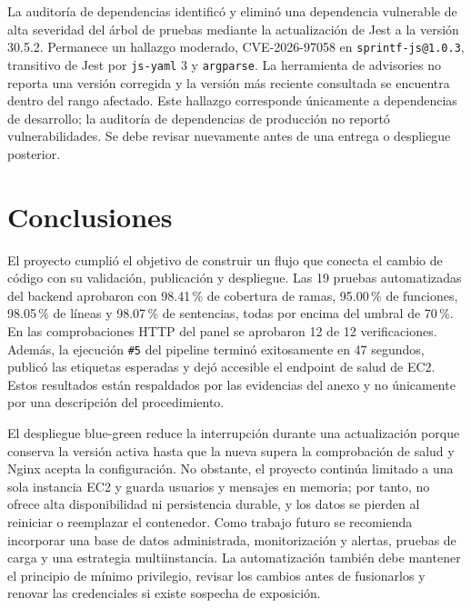 \documentclass[12pt,letterpaper]{article}
\begin{document}
La auditoría de dependencias identificó y eliminó una dependencia vulnerable de alta severidad del árbol de pruebas mediante la actualización de Jest a la versión 30.5.2. Permanece un hallazgo moderado, CVE-2026-97058 en \texttt{sprintf-js@1.0.3}, transitivo de Jest por \texttt{js-yaml} 3 y \texttt{argparse}. La herramienta de advisories no reporta una versión corregida y la versión más reciente consultada se encuentra dentro del rango afectado. Este hallazgo corresponde únicamente a dependencias de desarrollo; la auditoría de dependencias de producción no reportó vulnerabilidades. Se debe revisar nuevamente antes de una entrega o despliegue posterior.

\section{Conclusiones}
El proyecto cumplió el objetivo de construir un flujo que conecta el cambio de código con su validación, publicación y despliegue. Las 19 pruebas automatizadas del backend aprobaron con 98.41\,\% de cobertura de ramas, 95.00\,\% de funciones, 98.05\,\% de líneas y 98.07\,\% de sentencias, todas por encima del umbral de 70\,\%. En las comprobaciones HTTP del panel se aprobaron 12 de 12 verificaciones. Además, la ejecución \texttt{\#5} del pipeline terminó exitosamente en 47 segundos, publicó las etiquetas esperadas y dejó accesible el endpoint de salud de EC2. Estos resultados están respaldados por las evidencias del anexo y no únicamente por una descripción del procedimiento.

El despliegue blue-green reduce la interrupción durante una actualización porque conserva la versión activa hasta que la nueva supera la comprobación de salud y Nginx acepta la configuración. No obstante, el proyecto continúa limitado a una sola instancia EC2 y guarda usuarios y mensajes en memoria; por tanto, no ofrece alta disponibilidad ni persistencia durable, y los datos se pierden al reiniciar o reemplazar el contenedor. Como trabajo futuro se recomienda incorporar una base de datos administrada, monitorización y alertas, pruebas de carga y una estrategia multiinstancia. La automatización también debe mantener el principio de mínimo privilegio, revisar los cambios antes de fusionarlos y renovar las credenciales si existe sospecha de exposición.
\end{document}
